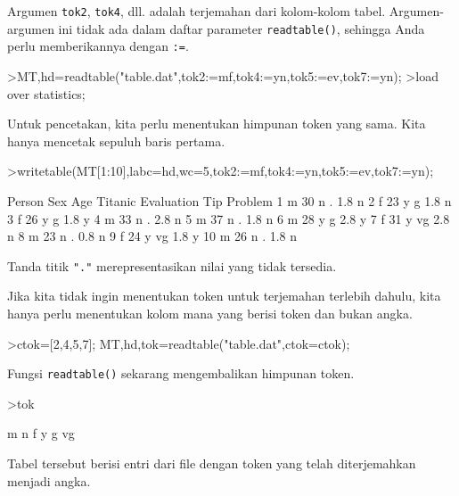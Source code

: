\documentclass[a4paper,11pt,oneside,enabledeprecatedfontcommands]{scrbook}
\newenvironment{eulernotebook}{}{}
\newenvironment{eulercomment}{\par\medskip\noindent}{\par\medskip}
\begin{document}
\begin{eulernotebook}
\begin{eulercomment}
			Argumen \texttt{tok2}, \texttt{tok4}, dll. adalah terjemahan dari kolom-kolom tabel. Argumen-argumen ini tidak ada
			dalam daftar parameter \texttt{readtable()}, sehingga Anda perlu memberikannya dengan \texttt{:=}.
		\end{eulercomment}
		\begin{eulerprompt}
			>{MT,hd}=readtable("table.dat",tok2:=mf,tok4:=yn,tok5:=ev,tok7:=yn);
			>load over statistics;
		\end{eulerprompt}
		\begin{eulercomment}
			Untuk pencetakan, kita perlu menentukan himpunan token yang sama. Kita hanya mencetak sepuluh baris
			pertama.
		\end{eulercomment}
		\begin{eulerprompt}
			>writetable(MT[1:10],labc=hd,wc=5,tok2:=mf,tok4:=yn,tok5:=ev,tok7:=yn);
		\end{eulerprompt}
		\begin{euleroutput}
			 Person  Sex  Age Titanic Evaluation  Tip Problem
			      1    m   30       n          .  1.8       n
			      2    f   23       y          g  1.8       n
			      3    f   26       y          g  1.8       y
			      4    m   33       n          .  2.8       n
			      5    m   37       n          .  1.8       n
			      6    m   28       y          g  2.8       y
			      7    f   31       y         vg  2.8       n
			      8    m   23       n          .  0.8       n
			      9    f   24       y         vg  1.8       y
			     10    m   26       n          .  1.8       n
		\end{euleroutput}
		\begin{eulercomment}
			Tanda titik \texttt{"."} merepresentasikan nilai yang tidak tersedia.
			
			Jika kita tidak ingin menentukan token untuk terjemahan terlebih dahulu, kita hanya perlu menentukan
			kolom mana yang berisi token dan bukan angka.
		\end{eulercomment}
		\begin{eulerprompt}
			>ctok=[2,4,5,7]; {MT,hd,tok}=readtable("table.dat",ctok=ctok);
		\end{eulerprompt}
		\begin{eulercomment}
			Fungsi \texttt{readtable()} sekarang mengembalikan himpunan token.
		\end{eulercomment}
		\begin{eulerprompt}
			>tok
		\end{eulerprompt}
		\begin{euleroutput}
			m
			n
			f
			y
			g
			vg
		\end{euleroutput}
		\begin{eulercomment}
			Tabel tersebut berisi entri dari file dengan token yang telah diterjemahkan menjadi angka.
			

\end{eulercomment}
\end{eulernotebook}
\end{document}
